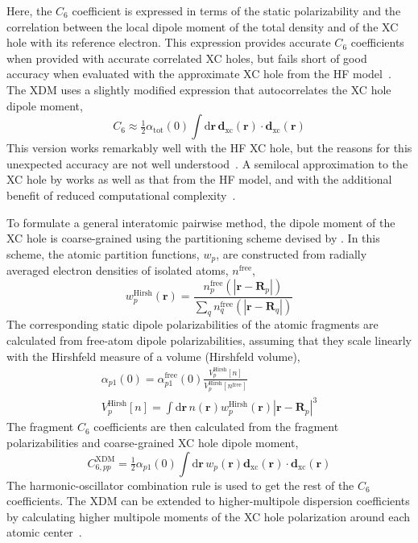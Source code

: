 Here, the $C_6$ coefficient is expressed in terms of the static polarizability and the correlation between the local dipole moment of the total density and of the XC hole with its reference electron.
This expression provides accurate $C_6$ coefficients when provided with accurate correlated XC holes, but fails short of good accuracy when evaluated with the approximate XC hole from the HF model~\cite{AngyanJCP07}.
The XDM uses a slightly modified expression that autocorrelates the XC hole dipole moment,
\begin{equation}
  C_6\approx\tfrac12\alpha_\text{tot}(0)\int\mathrm d\mathbf r\,\mathbf d_\text{xc}(\mathbf r)\cdot\mathbf d_\text{xc}(\mathbf r)
\end{equation}
This version works remarkably well with the HF XC hole, but the reasons for this unexpected accuracy are not well understood~\cite{AngyanJCP07,HesselmannJCP09,AyersJMC09}.
A semilocal approximation to the XC hole by \citet{BeckePRA89} works as well as that from the HF model, and with the additional benefit of reduced computational complexity~\cite{BeckeJCP05a}.

To formulate a general interatomic pairwise method, the dipole moment of the XC hole is coarse-grained using the partitioning scheme devised by \citet{HirshfeldTCA77}.
In this scheme, the atomic partition functions, $w_p$, are constructed from radially averaged electron densities of isolated atoms, $n^\text{free}$,
\begin{equation}
  w^\text{Hirsh}_p(\mathbf r)=
  \frac{n^\text{free}_p(|\mathbf r-\mathbf R_p|)}
  {\sum_q n^\text{free}_q(|\mathbf r-\mathbf R_q|)}
  \label{eq:hirshfeld}
\end{equation}
The corresponding static dipole polarizabilities of the atomic fragments are calculated from free-atom dipole polarizabilities, assuming that they scale linearly with the Hirshfeld measure of a volume (Hirshfeld volume),
\begin{gather}
  \alpha_{p1}(0)=\alpha_{p1}^\text{free}(0)\frac{V^\text{Hirsh}_p[n]}{V^\text{Hirsh}_p[n^\text{free}]} \\
  V_p^\text{Hirsh}[n]=\int\mathrm d\mathbf r\,n(\mathbf r)w^\text{Hirsh}_p(\mathbf r)|\mathbf r-\mathbf R_p|^3
  \label{eq:hirshfeld-vol}
\end{gather}
The fragment $C_6$ coefficients are then calculated from the fragment polarizabilities and coarse-grained XC hole dipole moment,
\begin{equation}
  C_{6,pp}^\text{XDM}=\tfrac12\alpha_{p1}(0)\int\mathrm d\mathbf r\,w_p(\mathbf r)\mathbf d_\text{xc}(\mathbf r)\cdot\mathbf d_\text{xc}(\mathbf r)
\end{equation}
The harmonic-oscillator combination rule is used to get the rest of the $C_6$ coefficients.
The XDM can be extended to higher-multipole dispersion coefficients by calculating higher multipole moments of the XC hole polarization around each atomic center~\cite{BeckeJCP06,JohnsonJCP06}.


